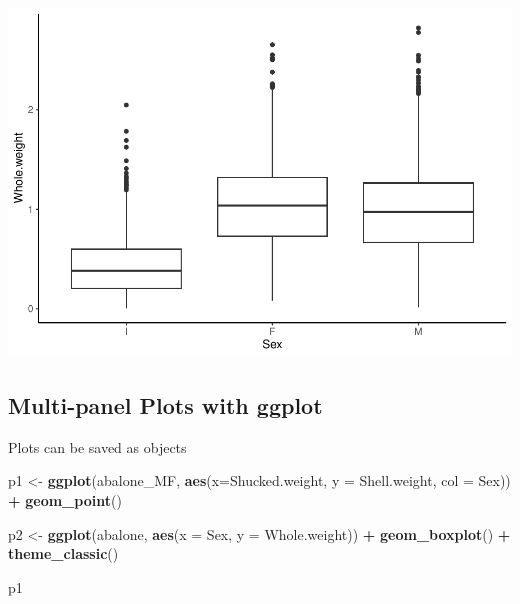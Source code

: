 \documentclass[
]{book}
\newenvironment{Shaded}{\begin{snugshade}}{\end{snugshade}}
\newcommand{\AttributeTok}[1]{\textcolor[rgb]{0.13,0.29,0.53}{#1}}
\newcommand{\FunctionTok}[1]{\textcolor[rgb]{0.13,0.29,0.53}{\textbf{#1}}}
\newcommand{\NormalTok}[1]{#1}
\newcommand{\OtherTok}[1]{\textcolor[rgb]{0.56,0.35,0.01}{#1}}
\newcommand{\SpecialCharTok}[1]{\textcolor[rgb]{0.81,0.36,0.00}{\textbf{#1}}}
\begin{document}
\includegraphics{_main_files/figure-latex/unnamed-chunk-51-1.pdf}

\subsection{Multi-panel Plots with ggplot}\label{multi-panel-plots-with-ggplot}

Plots can be saved as objects

\begin{Shaded}
\begin{Highlighting}[]
\NormalTok{p1 }\OtherTok{\textless{}{-}} \FunctionTok{ggplot}\NormalTok{(abalone\_MF, }\FunctionTok{aes}\NormalTok{(}\AttributeTok{x=}\NormalTok{Shucked.weight, }\AttributeTok{y =}\NormalTok{ Shell.weight, }\AttributeTok{col =}\NormalTok{ Sex)) }\SpecialCharTok{+}
  \FunctionTok{geom\_point}\NormalTok{()}

\NormalTok{p2 }\OtherTok{\textless{}{-}} \FunctionTok{ggplot}\NormalTok{(abalone, }\FunctionTok{aes}\NormalTok{(}\AttributeTok{x =}\NormalTok{ Sex, }\AttributeTok{y =}\NormalTok{ Whole.weight)) }\SpecialCharTok{+}
  \FunctionTok{geom\_boxplot}\NormalTok{() }\SpecialCharTok{+} 
  \FunctionTok{theme\_classic}\NormalTok{()}

\NormalTok{p1}
\end{Highlighting}
\end{Shaded}
\end{document}
